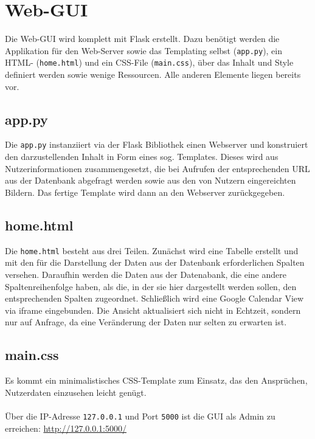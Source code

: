     
    \section{Web-GUI}
        Die Web-GUI wird komplett mit Flask erstellt. Dazu benötigt werden die Applikation für den Web-Server sowie das Templating selbst (\verb|app.py|), ein HTML- (\verb|home.html|) und ein CSS-File (\verb|main.css|), über das Inhalt und Style definiert werden sowie wenige Ressourcen. Alle anderen Elemente liegen bereits vor.
        
        \subsection{app.py} \label{app.py}
            Die \verb|app.py| instanziiert via der Flask Bibliothek einen Webserver und konstruiert den darzustellenden Inhalt in Form eines sog. Templates. Dieses wird aus Nutzerinformationen zusammengesetzt, die bei Aufrufen der entsprechenden URL aus der Datenbank abgefragt werden sowie aus den von Nutzern eingereichten Bildern. 
            Das fertige Template wird dann an den Webserver zurückgegeben.

        \subsection{home.html} \label{home.html}
            Die \verb|home.html| besteht aus drei Teilen. Zunächst wird eine Tabelle erstellt und mit den für die Darstellung der Daten aus der Datenbank erforderlichen Spalten versehen. Daraufhin werden die Daten aus der Datenabank, die eine andere Spaltenreihenfolge haben, als die, in der sie hier dargestellt werden sollen, den entsprechenden Spalten zugeordnet.
            Schließlich wird eine Google Calendar View via iframe eingebunden.
            Die Ansicht aktualisiert sich nicht in Echtzeit, sondern nur auf Anfrage, da eine Veränderung der Daten nur selten zu erwarten ist.

        \subsection{main.css} \label{main.css}
            Es kommt ein minimalistisches CSS-Template zum Einsatz, das den Ansprüchen, Nutzerdaten einzusehen leicht genügt.\\ \\

        Über die IP-Adresse \verb|127.0.0.1| und Port \verb|5000| ist die GUI als Admin zu erreichen: \url{http://127.0.0.1:5000/}


